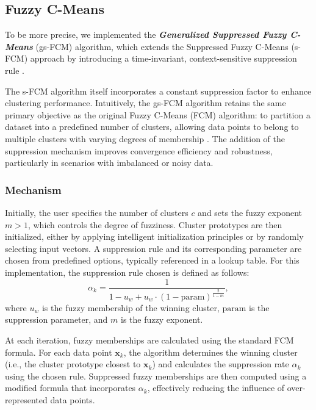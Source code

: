 \subsection{Fuzzy C-Means}
\label{subsec:methods-fuzzy-cmeans}

To be more precise, we implemented the \textbf{\textit{Generalized Suppressed Fuzzy C-Means}} (gs-FCM) algorithm,
which extends the Suppressed Fuzzy C-Means (s-FCM) approach by introducing a time-invariant,
context-sensitive suppression rule \cite{gsFCM, suppresedFCM}. 
  
The s-FCM algorithm itself incorporates a constant suppression factor to enhance clustering
performance. Intuitively, the gs-FCM algorithm retains the same primary objective as the original 
Fuzzy C-Means (FCM) algorithm: to partition a dataset into a predefined number of clusters,
allowing data points to belong to multiple clusters with varying degrees of membership \cite{fcm}.
The addition of the suppression mechanism improves convergence efficiency and robustness,
particularly in scenarios with imbalanced or noisy data.

\subsubsection{Mechanism}

Initially, the user specifies the number of clusters \( c \) and sets the fuzzy exponent \( m > 1 \), which controls the degree of fuzziness. Cluster prototypes are then initialized, either by applying intelligent initialization principles or by randomly selecting input vectors. A suppression rule and its corresponding parameter are chosen from predefined options, typically referenced in a lookup table. For this implementation, the suppression rule chosen is defined as follows:
\[
\alpha_k = \frac{1}{1 - u_w + u_w \cdot \left(1 - \text{param}\right)^{\frac{2}{1-m}}},
\]
where \( u_w \) is the fuzzy membership of the winning cluster, \( \text{param} \) is the suppression parameter, and \( m \) is the fuzzy exponent.

At each iteration, fuzzy memberships are calculated using the standard FCM formula. For each data point \( \mathbf{x}_k \), the algorithm determines the winning cluster (i.e., the cluster prototype closest to \( \mathbf{x}_k \)) and calculates the suppression rate \( \alpha_k \) using the chosen rule. Suppressed fuzzy memberships are then computed using a modified formula that incorporates \( \alpha_k \), effectively reducing the influence of over-represented data points.

